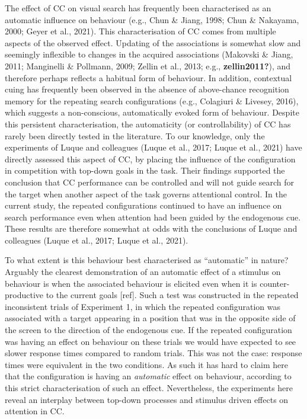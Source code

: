 \documentclass[
  man,floatsintext]{apa7}
\begin{document}
The effect of CC on visual search has frequently been characterised as an automatic influence on behaviour (e.g., Chun \& Jiang, 1998; Chun \& Nakayama, 2000; Geyer et al., 2021). This characterisation of CC comes from multiple aspects of the observed effect. Updating of the associations is somewhat slow and seemingly inflexible to changes in the acquired associations (Makovski \& Jiang, 2011; Manginelli \& Pollmann, 2009; Zellin et al., 2013; e.g., \textbf{zellin2011?}), and therefore perhaps reflects a habitual form of behaviour. In addition, contextual cuing has frequently been observed in the absence of above-chance recognition memory for the repeating search configurations (e.g., Colagiuri \& Livesey, 2016), which suggests a non-conscious, automatically evoked form of behaviour. Despite this persistent characterisation, the automaticity (or controllability) of CC has rarely been directly tested in the literature. To our knowledge, only the experiments of Luque and colleagues (Luque et al., 2017; Luque et al., 2021) have directly assessed this aspect of CC, by placing the influence of the configuration in competition with top-down goals in the task. Their findings supported the conclusion that CC performance can be controlled and will not guide search for the target when another aspect of the task governs attentional control. In the current study, the repeated configurations continued to have an influence on search performance even when attention had been guided by the endogenous cue. These results are therefore somewhat at odds with the conclusions of Luque and colleagues (Luque et al., 2017; Luque et al., 2021).

To what extent is this behaviour best characterised as ``automatic'' in nature? Arguably the clearest demonstration of an automatic effect of a stimulus on behaviour is when the associated behaviour is elicited even when it is counter-productive to the current goals {[}ref{]}. Such a test was constructed in the repeated inconsistent trials of Experiment 1, in which the repeated configuration was associated with a target appearing in a position that was in the opposite side of the screen to the direction of the endogenous cue. If the repeated configuration was having an effect on behaviour on these trials we would have expected to see slower response times compared to random trials. This was not the case: response times were equivalent in the two conditions. As such it has hard to claim here that the configuration is having an \emph{automatic} effect on behaviour, according to this strict characterisation of such an effect. Nevertheless, the experiments here reveal an interplay between top-down processes and stimulus driven effects on attention in CC.
\end{document}
